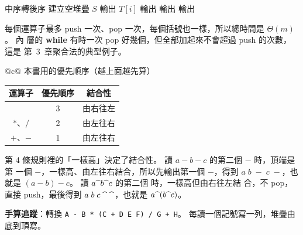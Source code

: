 \begin{pseudo}[label=alg:sq-infix-postfix]{中序轉後序}
    \State 建立空堆疊 $S$
            \State 輸出 $T[i]$
            \State {}
                \State 輸出 
            \EndWhile
            \State {} 
        \Else {}
                \State 輸出 
            \EndWhile
            \State {}
        \EndIf
    \EndFor
        \State 輸出 
    \EndWhile
\EndProcedure
\end{pseudo}

每個運算子最多 push 一次、pop 一次，每個括號也一樣，所以總時間是 $\Theta(m)$。 內
層的 \textbf{while} 有時一次 pop 好幾個，但全部加起來不會超過 push 的次數，這是
第~3~章聚合法的典型例子。

\begin{center}
\begin{tabular}{@{}c@{}}
本書用的優先順序（越上面越先算）\\[4pt]
\begin{tabular}{ccc}
\toprule
運算子 & 優先順序 & 結合性 \\
\midrule
\sqpow & 3 & 由右往左 \\
$*$、$/$ & 2 & 由左往右 \\
$+$、$-$ & 1 & 由左往右 \\
\bottomrule
\end{tabular}
\end{tabular}
\end{center}

第 4 條規則裡的「一樣高」決定了結合性。 讀 $a - b - c$ 的第二個 $-$ 時，頂端是第
一個 $-$，一樣高、由左往右結合，所以先輸出第一個 $-$，得到 $a\;b\;-\;c\;-$，也就是
$(a - b) - c$。 讀 $a \text{\textasciicircum} b \text{\textasciicircum} c$ 的第二個 \sqpow{} 時，一樣高但由右往左結
合，不 pop，直接 push，最後得到 $a\;b\;c\;\text{\textasciicircum}\;\text{\textasciicircum}$，也就是
$a \text{\textasciicircum} (b \text{\textasciicircum} c)$。

\textbf{手算追蹤}：轉換 \texttt{A - B * (C + D \sqpow{} E \sqpow{} F) / G + H}。
每讀一個記號寫一列，堆疊由底到頂寫。

